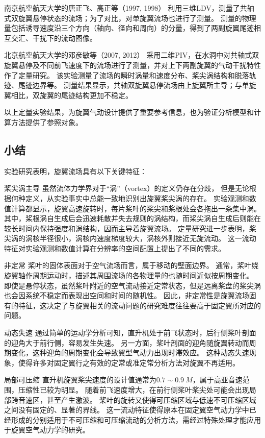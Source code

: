 南京航空航天大学的唐正飞、高正等（1997, 1998）
利用三维LDV，测量了共轴式双旋翼悬停状态的流场；为了对比，对单旋翼流场也进行了测量。
测量的物理量包括诱导速度沿三个方向（轴向、径向和周向）的分量，得到了两副旋翼尾迹相互交汇、干扰下的流动图像。

北京航空航天大学的邓彦敏等（2007, 2012）
采用二维PIV，在水洞中对共轴式双旋翼悬停及不同前飞速度下的流场进行了测量，并对上下两副旋翼的气动干扰特性作了定量研究。
该实验测量了流场的瞬时涡量和速度分布、桨尖涡结构和脱落轨迹、尾迹边界等。
测量结果显示，共轴双旋翼悬停流场由上旋翼所主导；与单旋翼相比，双旋翼的尾迹结构更加不稳定。

以上定量实验结果，为旋翼气动设计提供了重要参考信息，也为验证分析模型和计算方法提供了参照对象。

\subsection{小结}
实验研究表明，旋翼流场具有以下关键特征：
\begin{compactdesc}
  \item[桨尖涡主导]
  虽然流体力学界对于“涡”（vortex）的定义仍存在分歧，%
  但是无论根据何种定义，从实验事实中总能一致地识别出旋翼桨尖涡的存在。
  实验观测和数值计算都显示，旋翼高速旋转时，每片桨叶的桨尖和桨根处会各拖出一条集中涡。
  其中，桨根涡自生成后会迅速耗散并失去规则的涡结构，而桨尖涡自生成后则能在较长时间内保持强度和涡结构，因而主导着旋翼流场。
  定量研究进一步表明，桨尖涡的涡核半径很小，涡核内速度梯度较大，涡核外则接近无旋流动。
  这一流动特征对实验观测和数值计算在分辨率的空间配置上提出了不同的需求。
  \item[非定常]
  桨叶的固体表面对于空气流场而言，属于移动的壁面边界。
  通常，桨叶绕旋翼轴作周期运动时，描述其周围流场的各物理量的也随时间近似按周期变化。
  即使是悬停状态，虽然桨叶附近的空气流动接近定常状态，但是远离桨盘的桨尖涡也会因系统不稳定而表现出空间和时间的随机性。
  因此，非定常性是旋翼流场固有的特征，这决定了与旋翼相关的流动问题的研究难度往往要高于固定翼所对应的问题。
  \item[动态失速]
  通过简单的运动学分析可知，直升机处于前飞状态时，后行侧桨叶剖面的迎角大于前行侧，容易发生失速。
  另一方面，桨叶剖面的迎角随旋翼转动而周期变化，这种迎角的周期变化会导致翼型气动力出现时滞效应。
  这种动态失速现象，使得许多对固定翼行之有效的定常或准定常分析方法对旋翼不再适用。
  \item[局部可压缩]
  直升机旋翼桨尖速度的设计值通常为$0.7\sim0.9~M$，属于高亚音速范围，压缩性已较为明显。
  随着前飞速度增大，在前行侧桨叶桨尖处可能会出现局部跨音速区，甚至产生激波。
  桨叶的旋转又使得可压缩区域与低速不可压缩区域之间没有固定的、显著的界线。
  这一流动特征使得原本在固定翼空气动力学中已经形成的分别适用于不可压缩和可压缩流动的分析方法，需经过特殊处理才能应用于旋翼空气动力学的研究。
\end{compactdesc}

